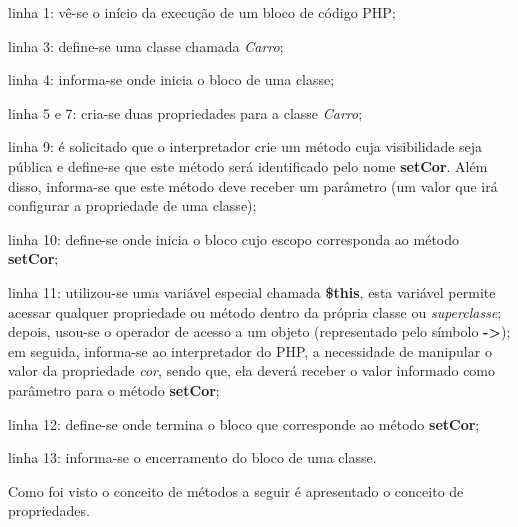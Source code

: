 \begin{alineas}
    \item linha 1: vê-se o início da execução de um bloco de código PHP;
    \item linha 3: define-se uma classe chamada \textit{Carro};
    \item linha 4: informa-se onde inicia o bloco de uma classe;
    \item linha 5 e 7: cria-se duas propriedades para a classe
    \textit{Carro};
    \item linha 9: é solicitado que o interpretador crie um método
    cuja visibilidade seja pública e define-se que este método será identificado
    pelo nome \textbf{setCor}.
    Além disso, informa-se que este método deve receber um parâmetro (um valor
    que  irá configurar a propriedade de uma classe);
    \item linha 10: define-se onde inicia o bloco cujo escopo
    corresponda ao método \textbf{setCor};
    \item linha 11: utilizou-se uma variável especial chamada
    \textbf{\$this}, esta variável permite acessar qualquer propriedade ou
    método dentro da própria classe ou \textit{superclasse}; depois, usou-se
    o operador de acesso a um objeto (representado pelo símbolo \textbf{->}); em
    seguida, informa-se ao interpretador do \acs{PHP}, a necessidade de
    manipular o valor da propriedade \textit{cor}, sendo que, ela deverá receber o valor
    informado como parâmetro para o método \textbf{setCor};
    \item linha 12: define-se onde termina o bloco que corresponde ao
    método \textbf{setCor};
    \item linha 13: informa-se o encerramento do bloco de uma classe.
\end{alineas}

Como foi visto o conceito de métodos a seguir é apresentado o conceito de
propriedades.
